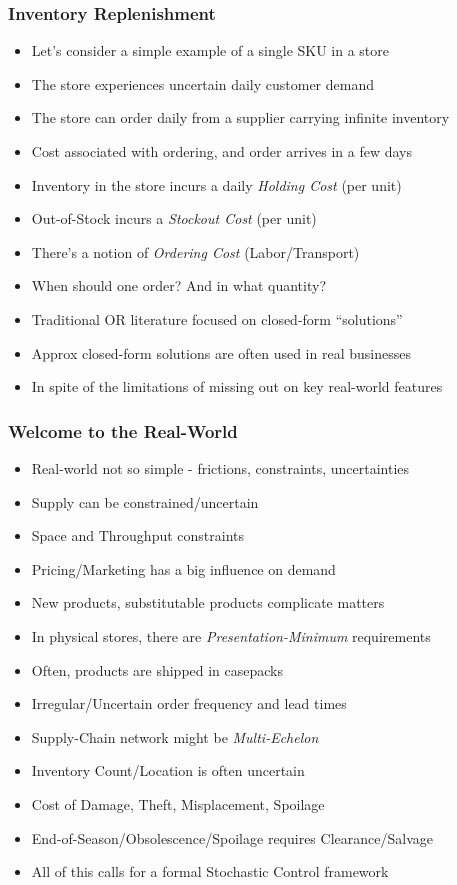 \documentclass[handout]{beamer}
\begin{document}
\begin{frame}
\frametitle{Inventory Replenishment}
\pause
\begin{itemize}[<+->]
\item Let's consider a simple example of a single SKU in a store
\item The store experiences uncertain daily customer demand
\item The store can order daily from a supplier carrying infinite inventory
\item Cost associated with ordering, and order arrives in a few days
\item Inventory in the store incurs a daily {\em Holding Cost} (per unit)
\item Out-of-Stock incurs a {\em Stockout Cost} (per unit)
\item There's a notion of {\em Ordering Cost} (Labor/Transport)
\item When should one order? And in what quantity?
\item Traditional OR literature focused on closed-form ``solutions''
\item Approx closed-form solutions are often used in real businesses
\item In spite of the limitations of missing out on key real-world features
\end{itemize}
\end{frame}


\begin{frame}
\frametitle{Welcome to the Real-World}
\pause
\begin{itemize}[<+->]
\item Real-world not so simple - frictions, constraints, uncertainties
\item Supply can be constrained/uncertain
\item Space and Throughput constraints
\item Pricing/Marketing has a big influence on demand
\item New products, substitutable products complicate matters
\item In physical stores, there are {\em Presentation-Minimum} requirements
\item Often, products are shipped in casepacks
\item Irregular/Uncertain order frequency and lead times
\item Supply-Chain network might be {\em Multi-Echelon}
\item Inventory Count/Location is often uncertain
\item Cost of Damage, Theft, Misplacement, Spoilage
\item End-of-Season/Obsolescence/Spoilage requires Clearance/Salvage
\item All of this calls for a formal Stochastic Control framework
\end{itemize}
\end{frame}
\end{document}

